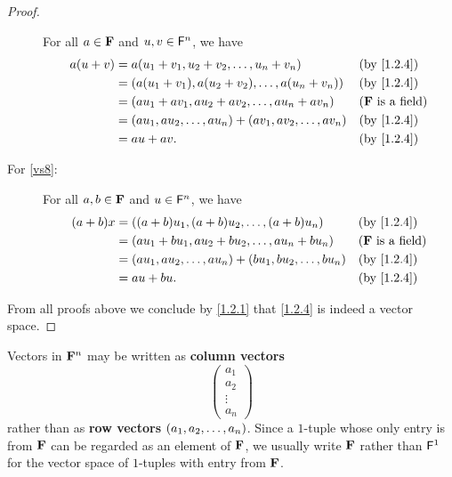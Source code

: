 \begin{proof}
\begin{description}
      For all \(a \in \mathbf{F}\) and \(u, v \in \mathsf{F}^{n}\), we have
      \begin{align*}
        a \p{u + v} & = a \p{u_{1} + v_{1}, u_{2} + v_{2}, \dots, u_{n} + v_{n}}                    &  & \text{(by \cref{1.2.4})}   \\
                    & = \p{a \p{u_{1} + v_{1}}, a \p{u_{2} + v_{2}}, \dots, a \p{u_{n} + v_{n}}}    &  & \text{(by \cref{1.2.4})}   \\
                    & = \p{a u_{1} + a v_{1}, a u_{2} + a v_{2}, \dots, a u_{n} + a v_{n}}          &  & \text{(\(\F\) is a field)} \\
                    & = \p{a u_{1}, a u_{2}, \dots, a u_{n}} + \p{a v_{1}, a v_{2}, \dots, a v_{n}} &  & \text{(by \cref{1.2.4})}   \\
                    & = a u + a v.                                                                  &  & \text{(by \cref{1.2.4})}
      \end{align*}
    \item[For \ref{vs8}:]
      For all \(a, b \in \mathbf{F}\) and \(u \in \mathsf{F}^{n}\), we have
      \begin{align*}
        \p{a + b} x & = \p{\p{a + b} u_{1}, \p{a + b} u_{2}, \dots, \p{a + b} u_{n}}                &  & \text{(by \cref{1.2.4})}   \\
                    & = \p{a u_{1} + b u_{1}, a u_{2} + b u_{2}, \dots, a u_{n} + b u_{n}}          &  & \text{(\(\F\) is a field)} \\
                    & = \p{a u_{1}, a u_{2}, \dots, a u_{n}} + \p{b u_{1}, b u_{2}, \dots, b u_{n}} &  & \text{(by \cref{1.2.4})}   \\
                    & = a u + b u.                                                                  &  & \text{(by \cref{1.2.4})}
      \end{align*}
  \end{description}
  From all proofs above we conclude by \cref{1.2.1} that \cref{1.2.4} is indeed a vector space.
\end{proof}

\begin{defn}\label{1.2.5}
  Vectors in \(\mathbf{F}^n\) may be written as \textbf{column vectors}
  \[
    \begin{pmatrix}
      a_{1}  \\
      a_{2}  \\
      \vdots \\
      a_{n}
    \end{pmatrix}
  \]
  rather than as \textbf{row vectors} \({\left\lparen{a}_{1}, {a}_{2}, \dots, {a}_{n}\right\rparen}\).
  Since a \(1\)-tuple whose only entry is from \(\mathbf{F}\) can be regarded as an element of \(\mathbf{F}\), we usually write \(\mathbf{F}\) rather than \(\mathsf{F}^{1}\) for the vector space of \(1\)-tuples with entry from \(\mathbf{F}\).
\end{defn}

